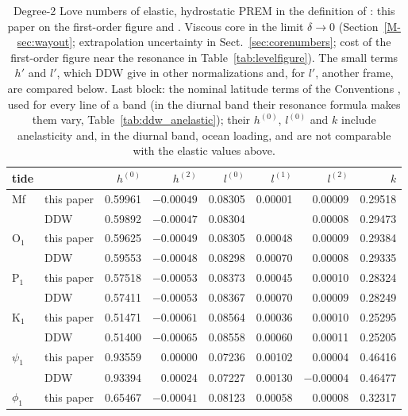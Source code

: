 \begin{table}
\caption{Degree-2 Love numbers of elastic, hydrostatic PREM in the definition
of \citet{mathews1995}: this paper on the first-order figure and \citet[][DDW,
tables~11 and 12]{dehant1999}. Viscous core in the limit $\delta\to0$
(Section~\ref{M-sec:wayout}; extrapolation uncertainty in Sect.~\ref{sec:corenumbers}; cost of the
first-order figure near the resonance in Table~\ref{tab:levelfigure}). The small terms
$h'$ and $l'$, which DDW give in other normalizations and, for $l'$, another frame, are compared
below. Last block: the nominal latitude terms of the Conventions \citep[][Sect.~7.1.1]{petit2010}, used for
every line of a band (in the diurnal band their resonance formula makes them vary, Table~\ref{tab:ddw_anelastic}); their $h^{(0)}$, $l^{(0)}$ and $k$ include anelasticity and, in the diurnal band, ocean
loading, and are not comparable with the elastic values above.}
\label{tab:ddw}
\small\setlength{\tabcolsep}{3pt}
\begin{tabular*}{\textwidth}{@{\extracolsep{\fill}}llrrrrrr@{}}
\toprule
tide & & $h^{(0)}$ & $h^{(2)}$ & $l^{(0)}$ & $l^{(1)}$ & $l^{(2)}$ & $k$ \\
\midrule
Mf & this paper & 0.59961 & $-0.00049$ & 0.08305 & 0.00001 & 0.00009 & 0.29518 \\
 & DDW & 0.59892 & $-0.00047$ & 0.08304 & & 0.00008 & 0.29473 \\
O$_1$ & this paper & 0.59625 & $-0.00049$ & 0.08305 & 0.00048 & 0.00009 & 0.29384 \\
 & DDW & 0.59553 & $-0.00048$ & 0.08298 & 0.00070 & 0.00008 & 0.29335 \\
P$_1$ & this paper & 0.57518 & $-0.00053$ & 0.08373 & 0.00045 & 0.00010 & 0.28324 \\
 & DDW & 0.57411 & $-0.00053$ & 0.08367 & 0.00070 & 0.00009 & 0.28249 \\
K$_1$ & this paper & 0.51471 & $-0.00061$ & 0.08564 & 0.00036 & 0.00010 & 0.25295 \\
 & DDW & 0.51400 & $-0.00065$ & 0.08558 & 0.00060 & 0.00011 & 0.25205 \\
$\psi_1$ & this paper & 0.93559 & 0.00000 & 0.07236 & 0.00102 & 0.00004 & 0.46416 \\
 & DDW & 0.93394 & 0.00024 & 0.07227 & 0.00130 & $-0.00004$ & 0.46477 \\
$\phi_1$ & this paper & 0.65467 & $-0.00041$ & 0.08123 & 0.00058 & 0.00008 & 0.32317 \\

\end{tabular*}
\end{table}
